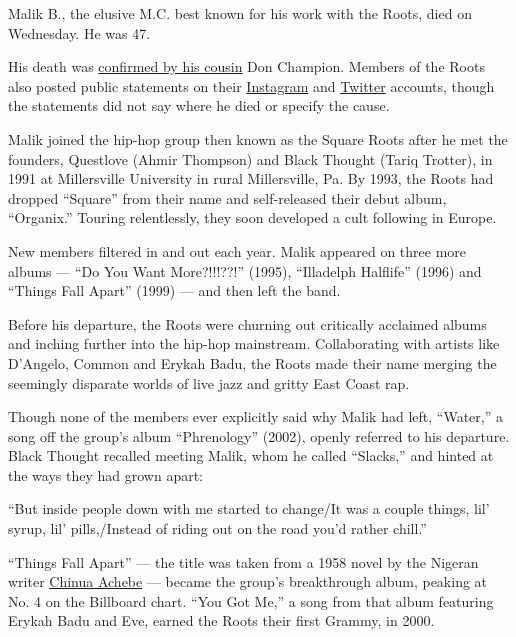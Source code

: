 Malik B., the elusive M.C. best known for his work with the Roots, died
on Wednesday. He was 47.

His death was
\href{https://twitter.com/DonChampionTV/status/1288520216574488577}{confirmed
by his cousin} Don Champion. Members of the Roots also posted public
statements on their
\href{https://www.instagram.com/p/CDPLAtJAFr7/}{Instagram} and
\href{https://twitter.com/theroots/status/1288571089019265025}{Twitter}
accounts, though the statements did not say where he died or specify the
cause.

Malik joined the hip-hop group then known as the Square Roots after he
met the founders, Questlove (Ahmir Thompson) and Black Thought (Tariq
Trotter), in 1991 at Millersville University in rural Millersville, Pa.
By 1993, the Roots had dropped ``Square'' from their name and
self-released their debut album, ``Organix.'' Touring relentlessly, they
soon developed a cult following in Europe.

New members filtered in and out each year. Malik appeared on three more
albums --- ``Do You Want More?!!!??!'' (1995), ``Illadelph Halflife''
(1996) and ``Things Fall Apart'' (1999) --- and then left the band.

Before his departure, the Roots were churning out critically acclaimed
albums and inching further into the hip-hop mainstream. Collaborating
with artists like D'Angelo, Common and Erykah Badu, the Roots made their
name merging the seemingly disparate worlds of live jazz and gritty East
Coast rap.

Though none of the members ever explicitly said why Malik had left,
``Water,'' a song off the group's album ``Phrenology'' (2002), openly
referred to his departure. Black Thought recalled meeting Malik, whom he
called ``Slacks,'' and hinted at the ways they had grown apart:

``But inside people down with me started to change/It was a couple
things, lil' syrup, lil' pills,/Instead of riding out on the road you'd
rather chill.''

``Things Fall Apart'' --- the title was taken from a 1958 novel by the
Nigeran writer
\href{https://www.nytimes3xbfgragh.onion/2013/03/23/world/africa/chinua-achebe-nigerian-writer-dies-at-82.html\#:~:text=Chinua\%20Achebe\%2C\%20the\%20Nigerian\%20author,died\%20after\%20a\%20brief\%20illness.}{Chinua
Achebe} --- became the group's breakthrough album, peaking at No. 4 on
the Billboard chart. ``You Got Me,'' a song from that album featuring
Erykah Badu and Eve, earned the Roots their first Grammy, in 2000.

